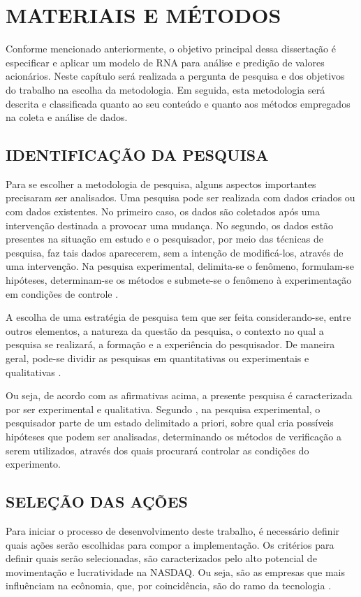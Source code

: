 
\chapter{MATERIAIS E MÉTODOS}\label{ch:materiais-metodos}
Conforme mencionado anteriormente, o objetivo principal dessa dissertação é especificar e aplicar um modelo de RNA para análise e predição de valores acionários. Neste capítulo será realizada a pergunta de pesquisa e dos objetivos do trabalho na escolha da metodologia. Em seguida, esta metodologia será descrita e classificada quanto ao seu conteúdo e quanto aos métodos empregados na coleta e análise de dados.

\section{IDENTIFICAÇÃO DA PESQUISA}

Para se escolher a metodologia de pesquisa, alguns aspectos importantes precisaram ser analisados. Uma pesquisa pode ser realizada com dados criados ou com dados existentes. No primeiro caso, os dados são coletados após uma intervenção destinada a provocar uma mudança. No segundo, os dados estão presentes na situação em estudo e o pesquisador, por meio das técnicas de pesquisa, faz tais dados aparecerem, sem a intenção de modificá-los, através de uma intervenção. Na pesquisa experimental, delimita-se o fenômeno, formulam-se hipóteses, determinam-se os métodos e submete-se o fenômeno à experimentação em condições de controle \cite{laville}.

A escolha de uma estratégia de pesquisa tem que ser feita considerando-se, entre outros elementos, a natureza da questão da pesquisa, o contexto no qual a pesquisa se realizará, a formação e a experiência do pesquisador. De maneira geral, pode-se dividir as pesquisas em quantitativas ou experimentais e qualitativas \cite{laville}.

Ou seja, de acordo com as afirmativas acima, a presente pesquisa é caracterizada por ser experimental e qualitativa. Segundo , na pesquisa experimental, o pesquisador parte de um estado delimitado a priori, sobre qual cria possíveis hipóteses que podem ser analisadas, determinando os métodos de verificação a serem utilizados, através dos quais procurará controlar as condições do experimento.

\section{SELEÇÃO DAS AÇÕES}
Para iniciar o processo de desenvolvimento deste trabalho, é necessário definir quais ações serão escolhidas para compor a implementação. Os critérios para definir quais serão selecionadas, são caracterizados pelo alto potencial de movimentação e lucratividade na NASDAQ. Ou seja, são as empresas que mais influênciam na ecônomia, que, por coincidência, são do ramo da tecnologia \cite{christie}.

